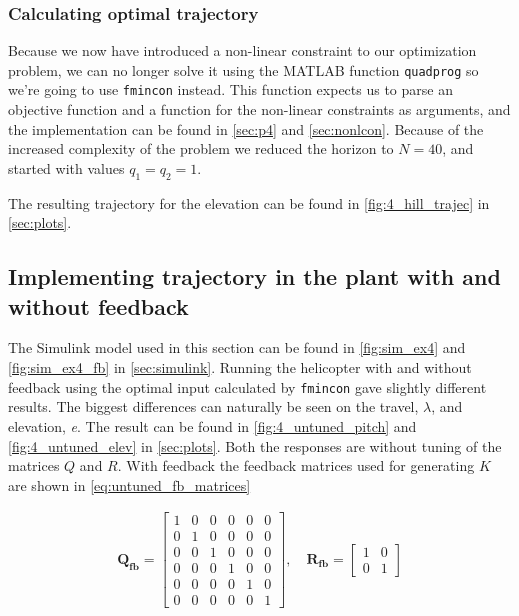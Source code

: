 \subsubsection{Calculating optimal trajectory}

Because we now have introduced a non-linear constraint to our optimization problem, we can no longer solve it using the MATLAB function \texttt{quadprog} so we're going to use \texttt{fmincon} instead. This function expects us to parse an objective function and a function for the non-linear constraints as arguments, and the implementation can be found in \cref{sec:p4} and \ref{sec:nonlcon}. Because of the increased complexity of the problem we reduced the horizon to $N = 40$, and started with values $q_1 = q_2 = 1$.

The resulting trajectory for the elevation can be found in \cref{fig:4_hill_trajec} in \cref{sec:plots}.

\subsection{Implementing trajectory in the plant with and without feedback}\label{sec:ex4.4}

The Simulink model used in this section can be found in \cref{fig:sim_ex4} and \cref{fig:sim_ex4_fb} in \cref{sec:simulink}.
Running the helicopter with and without feedback using the optimal input calculated by \texttt{fmincon} gave slightly different results. The biggest differences can naturally be seen on the travel, $\lambda$, and elevation, \textit{e}. The result can be found in \cref{fig:4_untuned_pitch} and \cref{fig:4_untuned_elev} in \cref{sec:plots}.
Both the responses are without tuning of the matrices $Q$ and $R$.
With feedback the feedback matrices used for generating $K$ are shown in \cref{eq:untuned_fb_matrices}

\begin{equation}\label{eq:untuned_fb_matrices}
    \begin{aligned}
        \mathbf{Q_{fb}} =
        \begin{bmatrix} 
        1 & 0 & 0 & 0 & 0 & 0 \\ 0 & 1 & 0 & 0 & 0 & 0 \\ 0 & 0 & 1 & 0 & 0 & 0 \\ 
        0 & 0 & 0 & 1 & 0 & 0 \\ 0 & 0 & 0 & 0 & 1 & 0 \\ 0 & 0 & 0 & 0 & 0 & 1
        \end{bmatrix}, \quad
        \mathbf{R_{fb}} =
        \begin{bmatrix} 1 & 0 \\ 0 & 1  \end{bmatrix}
    \end{aligned}
\end{equation}


